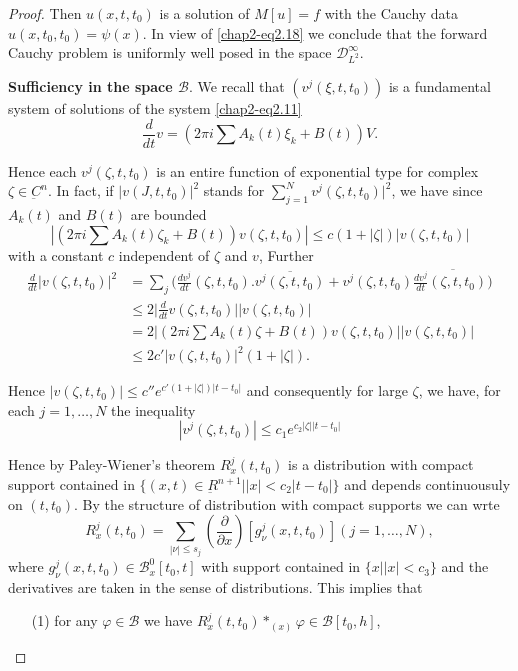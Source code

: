 \begin{proof}
Then $ u (x, t, t_0)$ is a solution of $ M[u] = f $ with the Cauchy
data $ u (x, t_0, t_0) = \psi (x)$. In view of \eqref{chap2-eq2.18} we conclude
that the forward Cauchy problem is uniformly well posed in the space 
$\mathscr{D}_{L^2}^\infty$. 

\smallskip
\noindent
 \textbf{Sufficiency in the space $\mathscr{B}$}. We recall that 
$(v^j (\xi,  t,  t_0))$ is a fundamental 
system of solutions of the system \eqref{chap2-eq2.11}  
$$
\frac{d}{dt} v= (2 \pi i \sum A_k(t) \xi_k + B(t)) V. 
$$

Hence each $v^j (\zeta, t, t_0)$ is an entire function of exponential
type for complex $ \zeta \in \underbar{C}^n$. In fact,  if $ | v(J,
t, t_0)|^2$ stands for $ \sum\limits _{j=1 }^{N}v^j (\zeta , t,
t_0)|^2$,  we have since $ A_k (t)$ and $ B(t)$ are bounded 
\begin{equation}
|(2\pi i \sum A_k (t) \zeta _k + B(t)) v (\zeta,  t, t_0) | \leq c
(1+|\zeta|)| v (\zeta, t, t_0)| \tag{2.19}\label{chap2-eq2.19}   
\end{equation}\pageoriginale
with a constant $c$ independent of $\zeta$ and $v$,  Further  
\begin{align*}
\frac{d}{dt} | v (\zeta, t, t_0) |^2 &= \sum_j (\frac{dv^j}{dt} (
\zeta,  t, t_0). \overline{v^j (\zeta, t, t_0)} + v^j(\zeta, t, t_0)
\overline{\frac{dv^j}{dt} (\zeta,  t, t_0))}\\ 
&\leq 2 \Big| \frac{d}{dt} v (\zeta, t, t_0) | |v (\zeta,  t, t_0)\Big|\\
& = 2 | (2 \pi i \sum A_k (t) \zeta + B (t)) v (\zeta,  t, t_0)|| v
(\zeta , t, t_0)|\\ 
&\leq 2c' | v (\zeta, t, t_0)|^2 (1+|\zeta | ).
\end{align*}

Hence $|v (\zeta, t, t_0 ) | \leq c'' e^{c' (1+ |\zeta |)|t-t_{0}|}$
and consequently for large $\zeta$,  we have,  for each 
$j=1, \ldots , N$ the inequality 
$$
|v^j (\zeta, t, t_0)| \leq c_1 e^{c_2 |\zeta| |t-t_0|} 
$$

Hence by Paley-Wiener's theorem $R^j_x (t, t_0)$ is a distribution
with compact support contained in $\{(x, t) \in \underbar{R}^{n+1}|
|x| < c_2 |t-t_0| \}$ and depends continuousuly on $(t, t_0)$. By the
structure of distribution with compact supports we can wrte  
\begin{equation}
R^j_x(t, t_0) = \sum\limits_{|\nu| \leq s_j} (\frac{\partial}{\partial
  x}) [g^j_\nu (x, t, t_0)] (j=1, \ldots, N), \tag{2.20}\label{chap2-eq2.20}   
\end{equation}
where $g^j_\nu(x, t, t_0) \in \mathscr{B}^0_x [t_0, t]$ with support
contained in $\{x \big| |x|< c_3\}$ and the derivatives are taken in
the sense of distributions. This implies that  
\begin{itemize}
\item[(1)] for any $\varphi \in \mathscr{B}$ we have $R^j_x(t, t_{0}) *_{(x)} 
\varphi \in \mathscr{B}[t_0, h]$, 
 

\end{itemize}
\end{proof}

